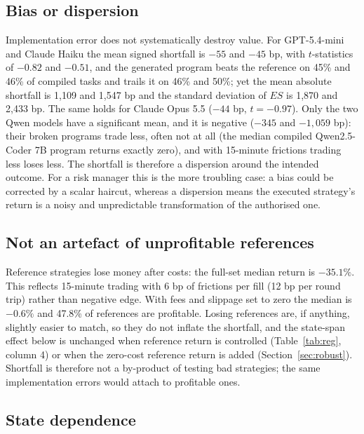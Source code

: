 \documentclass[a4paper,fleqn]{cas-sc}
\begin{document}
\subsection{Bias or dispersion}

Implementation error does not systematically destroy value. For GPT-5.4-mini and Claude Haiku the mean signed shortfall is $-55$ and $-45$ bp, with $t$-statistics of $-0.82$ and $-0.51$, and the generated program beats the reference on 45\% and 46\% of compiled tasks and trails it on 46\% and 50\%; yet the mean absolute shortfall is 1{,}109 and 1{,}547 bp and the standard deviation of $ES$ is 1{,}870 and 2{,}433 bp. The same holds for Claude Opus 5.5 ($-44$ bp, $t=-0.97$). Only the two Qwen models have a significant mean, and it is negative ($-345$ and $-1{,}059$ bp): their broken programs trade less, often not at all (the median compiled Qwen2.5-Coder 7B program returns exactly zero), and with 15-minute frictions trading less loses less. The shortfall is therefore a dispersion around the intended outcome. For a risk manager this is the more troubling case: a bias could be corrected by a scalar haircut, whereas a dispersion means the executed strategy's return is a noisy and unpredictable transformation of the authorised one.

\subsection{Not an artefact of unprofitable references}

Reference strategies lose money after costs: the full-set median return is $-35.1\%$. This reflects 15-minute trading with 6 bp of frictions per fill (12 bp per round trip) rather than negative edge. With fees and slippage set to zero the median is $-0.6\%$ and 47.8\% of references are profitable. Losing references are, if anything, slightly easier to match, so they do not inflate the shortfall, and the state-span effect below is unchanged when reference return is controlled (Table~\ref{tab:reg}, column 4) or when the zero-cost reference return is added (Section~\ref{sec:robust}). Shortfall is therefore not a by-product of testing bad strategies; the same implementation errors would attach to profitable ones.

\subsection{State dependence}
\end{document}
